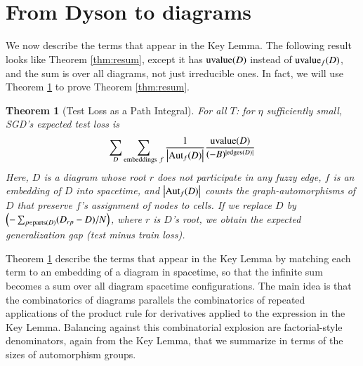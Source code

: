 \documentclass[openany, notitlepage, justified]{tufte-book}
\theoremstyle{plain}
\newtheorem{thm}{Theorem}
\theoremstyle{definition}
\newcommand{\wrap}[1]{\left(#1\right)}
\newcommand{\wabs}[1]{\left|#1\right|}
\newcommand{\Aut}{\text{\textnormal{Aut}}}
\newcommand{\uvalue}{\text{\textnormal{uvalue}}}
\newcommand{\edges}{\text{\textnormal{edges}}}
\newcommand{\parts}{\text{\textnormal{parts}}}
\begin{document}
    \section{From Dyson to diagrams}                             \label{appendix:toward-diagrams}

        We now describe the terms that appear in the Key Lemma.  The following
        result looks like Theorem \ref{thm:resum}, except it has $\uvalue(D)$
        instead of $\uvalue_f(D)$, and the sum is over all diagrams, not just
        irreducible ones.  In fact, we will use Theorem \ref{thm:pathint} to
        prove Theorem \ref{thm:resum}.

        \begin{thm}[Test Loss as a Path Integral] \label{thm:pathint}
            For all $T$: for $\eta$ sufficiently small, SGD's expected test
            loss is
            \begin{equation*}\label{eq:sgdcoef}
                \sum_{D}
                    \sum_{\text{embeddings}~f}
                    \frac{1}{\wabs{\Aut_f(D)}}
                \frac{\uvalue(D)}{(-B)^{|\edges(D)|}}
            \end{equation*}
            Here, $D$ is a diagram whose root $r$ does not participate in
            any fuzzy edge, $f$ is an embedding of $D$ into spacetime, and
            $\wabs{\Aut_f(D)}$ counts the graph-automorphisms of $D$ that
            preserve $f$'s assignment of nodes to cells.
            If we replace $D$ by 
            $
                \wrap{-\sum_{p \in \parts(D)} (D_{rp} - D)/N}
            $, where $r$ is $D$'s root,
            we obtain the expected generalization gap (test minus train loss).
        \end{thm}

        Theorem \ref{thm:pathint} describe the terms that appear in the Key
        Lemma by matching each term to an embedding of a diagram in spacetime,
        so that the infinite sum becomes a sum over all diagram spacetime
        configurations.  The main idea is that the combinatorics of diagrams
        parallels the combinatorics of repeated applications of the product
        rule for derivatives applied to the expression in the Key Lemma.
        Balancing against this combinatorial explosion are factorial-style
        denominators, again from the Key Lemma, that we summarize in terms of
        the sizes of automorphism groups.
\end{document}
